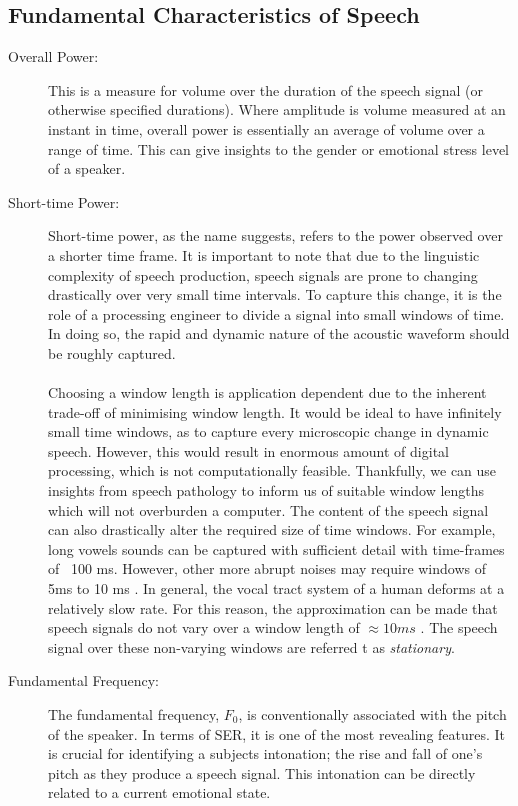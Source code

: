 \subsection{Fundamental Characteristics of Speech}
\begin{description}
\item[Overall Power:]
This is a measure for volume over the duration of the speech signal (or otherwise specified durations). Where amplitude is volume measured at an instant in time, overall power is essentially an average of volume over a range of time. This can give insights to the gender or emotional stress level of a speaker. 

\item[Short-time Power:]
Short-time power, as the name suggests, refers to the power observed over a shorter time frame. It is important to note that due to the linguistic complexity of speech production, speech signals are prone to changing drastically over very small time intervals. To capture this change, it is the role of a processing engineer to divide a signal into small windows of time. In doing so, the rapid and dynamic nature of the acoustic waveform should be roughly captured.\\ \\
Choosing a window length is application dependent due to the inherent trade-off of minimising window length. It would be ideal to have infinitely small time windows, as to capture every microscopic change in dynamic speech. However, this would result in enormous amount of digital processing, which is not computationally feasible. Thankfully, we can use insights from speech pathology to inform us of suitable window lengths which will not overburden a computer. The content of the speech signal can also drastically alter the required size of time windows. For example, long vowels  sounds can be captured with sufficient detail with time-frames of ~100 ms. However, other more abrupt noises may require windows of 5ms to 10 ms \cite{SP_03_textbook}. In general, the vocal tract system of a human deforms at a relatively slow rate. For this reason, the approximation can be made that speech signals do not vary over a window length of $\approx 10ms$ \cite{introtoDSP_core2}. The speech signal over these non-varying windows are referred t as \textit{stationary}.

\item[Fundamental Frequency:]
The fundamental frequency, $F_0$, is conventionally associated with the pitch of the speaker. In terms of SER, it is one of the most revealing features. It is crucial for identifying a subjects intonation; the rise and fall of one's pitch as they produce a speech signal. This intonation can be directly related to a current emotional state.


\end{description}
